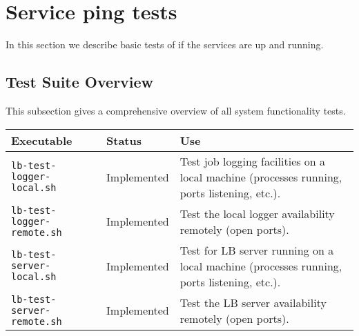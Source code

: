 





\section{Service ping tests}
\label{s:ping}

In this section we describe basic tests of \LB if the services are up and running.

\subsection{Test Suite Overview}

This subsection gives a comprehensive overview of all system functionality tests.

\begin{tabularx}{\textwidth}{|l|l|X|}
\hline
     {\bf Executable} & {\bf Status} & {\bf Use} \\
\hline
{\tt lb-test-logger-local.sh} & Implemented & Test job logging facilities on a local machine (processes running, ports listening, etc.). \\
\hline
{\tt lb-test-logger-remote.sh} & Implemented & Test the local logger availability remotely (open ports). \\
\hline
{\tt lb-test-server-local.sh} & Implemented & Test for LB server running on a local machine (processes running, ports listening, etc.). \\
\hline
{\tt lb-test-server-remote.sh} & Implemented & Test the LB server availability remotely (open ports). \\
\hline
\end{tabularx}

